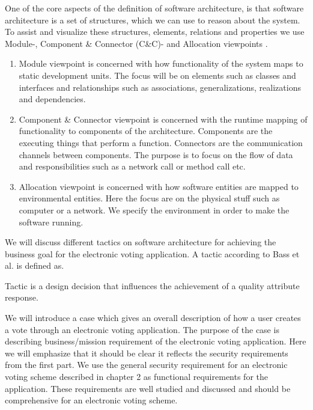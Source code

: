 \noindent
One of the core aspects of the definition of software architecture, is that software architecture is a set of structures, which we can use to reason about the system. To assist and visualize these structures, elements, relations and properties we use Module-, Component \& Connector (C\&C)- and Allocation viewpoints \cite{3+1}. 

\begin{enumerate}
    \item Module viewpoint is concerned with how functionality of the system maps to static development units. The focus will be on elements such as classes and interfaces and relationships such as associations, generalizations, realizations and dependencies.
    \item Component \& Connector viewpoint is concerned with the runtime mapping of functionality to components of the architecture. Components are the executing things that perform a function. Connectors are the communication channels between components. The purpose is to focus on the flow of data and responsibilities such as a network call or method call etc.
    \item Allocation viewpoint is concerned with how software entities are mapped to environmental entities. Here the focus are on the physical stuff such as computer or a network. We specify the environment in order to make the software running. 
\end{enumerate}

\noindent
We will discuss different tactics on software architecture for achieving the business goal for the electronic voting application. A tactic according to Bass et al. is defined as.

\begin{defi}
Tactic is a design decision that influences the achievement of a quality attribute response. \cite{Bass}
\end{defi}

\noindent
We will introduce a case which gives an overall description of how a user creates a vote through an electronic voting application. The purpose of the case is describing business/mission requirement of the electronic voting application. Here we will emphasize that it should be clear it reflects the security requirements from the first part. We use the general security requirement for an electronic voting scheme described in chapter 2 as functional requirements for the application. These requirements are well studied and discussed and should be comprehensive for an electronic voting scheme.